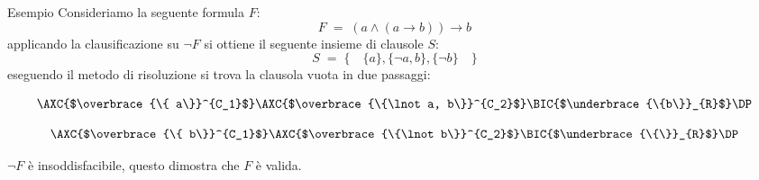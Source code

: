 \documentclass{beamer}
\begin{document}
\begin{frame}{Esempio}
    Consideriamo la seguente formula $F$:
    \[
        F \; = \; (a \land (a \to b)) \to b
    \]
    applicando la clausificazione su $\lnot F$ si ottiene il seguente insieme di clausole $S$:
    \[
        S \; = \; \{\quad \{a\}, \{\lnot a, b\}, \{\lnot b\} \quad\}
    \]
    eseguendo il metodo di risoluzione si trova la clausola vuota in due passaggi:
    \begin{center}
        \begin{minipage}{0.45\textwidth}
            \[
                \AXC{$\overbrace{\{ a\}}^{C_1}$}
                \AXC{$\overbrace{\{\lnot a, b\}}^{C_2}$}
                \RightLabel{Res}
                \BIC{$\underbrace{\{b\}}_{R}$}
                \DP
            \]
        \end{minipage}
        \hspace{0.05\textwidth}
        \begin{minipage}{0.45\textwidth}
            \[
                \AXC{$\overbrace{\{ b\}}^{C_1}$}
                \AXC{$\overbrace{\{\lnot b\}}^{C_2}$}
                \RightLabel{Res}
                \BIC{$\underbrace{\{\}}_{R}$}
                \DP
            \]
        \end{minipage}
    \end{center}
    $\lnot F$ è insoddisfacibile, questo dimostra che $F$ è valida.
\end{frame}


\backmatter
\end{document}
